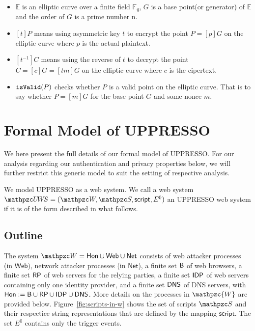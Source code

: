 \documentclass[letterpaper,onecolumn,10pt]{article}
\begin{document}
\begin{itemize}
  \item $\mathbb{E}$ is an elliptic curve over a finite field $\mathbb{F}_q$, $G$ is a base point(or generator) of $\mathbb{E}$ and the order of $G$ is a prime number n.
  \item $[t]P$ means using asymmetric key $t$ to encrypt the point $P=[p]G$ on the elliptic curve where $p$ is the actual plaintext.
  \item $[t^{-1}]C$ means using the reverse of $t$ to decrypt the point $C=[c]G=[tm]G$ on the elliptic curve where $c$ is the cipertext.  
  \item $\mathtt{isValid}(P)$ checks whether $P$ is a valid point on the elliptic curve. That is to say whether $P=[m]G$ for the base point $G$ and some nonce $m$.
\end{itemize}

\section{Formal Model of UPPRESSO}
\label{app:model-uppresso}
We here present the full details of our formal model of UPPRESSO. For our analysis regarding our authentication and privacy properties below, we will further restrict this generic model to suit the setting of respective analysis.\par
We model UPPRESSO as a web system. We call a web system $\uppressowebsystem=(\bidsystem, \scriptset, \mathsf{script}, E^0)$ an UPPRESSO web system if it is of the form described in what follows.

\subsection{Outline}\label{app:outlineuppressomodel}
The system $\bidsystem=\mathsf{Hon}\cup \mathsf{Web} \cup \mathsf{Net}$ consists of web attacker processes (in $\mathsf{Web}$), network attacker processes (in $\mathsf{Net}$), a finite set $\mathsf{B}$ of web browsers, a finite set $\mathsf{RP}$ of web servers for the relying parties, a finite set $\mathsf{IDP}$ of web servers containing only one identity provider, and a finite set $\mathsf{DNS}$ of DNS servers, 
with $\mathsf{Hon} := \mathsf{B} \cup \mathsf{RP} \cup \mathsf{IDP} \cup \mathsf{DNS}$. More details on the processes in $\mathpzc{W}$ are provided below. 
%
Figure~\ref{fig:scripts-in-w} shows the set of scripts $\scriptset$ 
and their respectice string representations that are defined by the 
mapping $\mathsf{script}$. 
%
The set $E^0$ contains only the trigger events.
\end{document}
